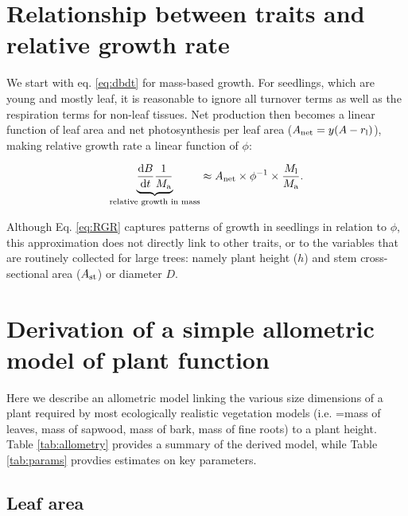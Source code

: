 \documentclass[12pt, a4paper]{article}
\begin{document}
\begin{appendices}
\setcounter{figure}{0} \renewcommand{\thefigure}{S\arabic{figure}}
\setcounter{table}{0} \renewcommand{\thetable}{S\arabic{table}}

\section{Relationship between traits and relative growth rate} \label{app:traits-RGR}

We start with eq. \ref{eq:dbdt} for mass-based growth. For seedlings, which are
young and mostly leaf, it is reasonable to ignore all turnover terms as
well as the respiration terms for non-leaf tissues. Net production then
becomes a linear function of leaf area and net photosynthesis per leaf
area ($A_\textrm{net} = y(A - r_{\rm l})$), making relative growth
rate a linear function of $\phi$:

\begin{equation}\label{eq:RGR}
\underbrace{\strut\frac{{\rm d}B}{{\rm d}t}\frac{1}{M_{\rm a}}}_\textrm{relative growth in mass}  \approx A_\textrm{net} \times \phi^{-1} \times \frac{M_{\rm l}}{M_{\rm a}}. \end{equation}

Although Eq. \ref{eq:RGR} captures patterns of growth in seedlings in
relation to $\phi$\citep{wright_cross-2000}, this
approximation does not directly link to other traits, or to the
variables that are routinely collected for large trees: namely plant
height ($h$) and stem cross-sectional area ($A_{\rm st}$) or
diameter $D$.


\section{Derivation of a simple allometric model of plant
function}\label{app:func_balance}

Here we describe an allometric model linking the various size dimensions
of a plant required by most ecologically realistic vegetation models
(i.e. =mass of leaves, mass of sapwood, mass of bark, mass of fine
roots) to a plant height. Table \ref{tab:allometry} provides a summary
of the derived model, while Table \ref{tab:params} provdies estimates on
key parameters.


\subsection{Leaf area}\label{leaf-area}


\end{appendices}
\end{document}
